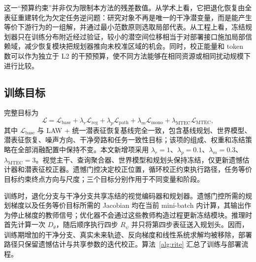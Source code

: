 \documentclass[letterpaper,10pt,conference]{ieeeconf}
\begin{document}
这一“预算约束”并非仅为限制本方法的残差数值。从学术上看，它把退化恢复由全表征重建转化为欠定任务逆问题：研究对象不再是唯一的干净潜变量，而是能产生等价下游行为的一组解，并通过最小范数原则选取局部代表。从工程上看，冻结规划器只在训练分布附近经过验证，较小的潜空间位移相当于对部署接口施加局部信赖域，减少恢复模块把规划器推向未校准区域的机会。同时，校正能量和 token 数可以作为独立于 L2 的干预预算，使不同方法能够在相同资源或相同扰动规模下进行比较。

\subsection{训练目标}

完整目标为
\begin{equation}
\mathcal L=\mathcal L_{\mathrm{base}}+
\lambda_r\mathcal L_{\mathrm{reg}}+
\lambda_p\mathcal L_{\mathrm{path}}+
\lambda_m\mathcal L_{\mathrm{mono}}+
\lambda_{\mathrm{MTEC}}\mathcal L_{\mathrm{MTEC}},
\label{eq:total_loss}
\end{equation}
其中 $\mathcal L_{\mathrm{base}}$ 与 LAW + 统一潜表征恢复基线完全一致，包含基线规划、世界模型、潜表征恢复、噪声方向、干净旁路和任务一致性目标；该项的组成、权重和冻结策略在全部消融配置中保持不变。本文新增项采用 $\lambda_r=1$、$\lambda_p=0.1$、$\lambda_m=0.3$、$\lambda_{\mathrm{MTEC}}=3$。视觉主干、查询聚合器、世界模型和规划头保持冻结，仅更新遗憾估计器和潜表征校正器。遗憾门控决定校正位置，循环校正约束执行路径，任务等价目标约束终点方向与尺度；三个目标分别作用于不同变量和阶段。

训练时，退化分支与干净分支共享冻结的视觉编码器和规划器。遗憾门控所需的规划梯度以及任务等价目标所需的 Jacobian 均在当前 mini-batch 内计算，其输出作为停止梯度的教师信号；优化器不会通过这些教师构造过程更新冻结模块。推理时首先计算一次 $D_\theta$，随后顺序执行四步 $R_\psi$ 并只将第四步表征送入规划头。因而，训练期增加的干净分支、真实未来轨迹、反向梯度和线性系统求解均被移除，部署路径只保留遗憾估计与共享参数的迭代校正。算法~\ref{alg:rite} 汇总了训练与部署流程。
\end{document}

